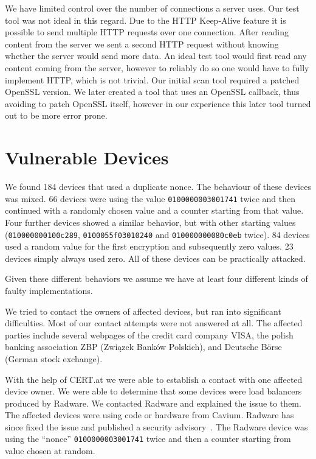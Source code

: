 \documentclass[10pt, a4paper]{article}
\begin{document}
We have limited control over the number of connections a server uses. Our test tool was not ideal in this regard.
Due to the HTTP Keep-Alive feature
it is possible to send multiple HTTP requests over one connection. After reading content from the server we sent a second HTTP request without knowing whether the server would
send more data. An ideal test tool would first
read any content coming from the server, however to reliably do so one would have to fully implement
HTTP, which is not trivial.
Our initial scan tool required a patched OpenSSL version. We later created a tool that uses an OpenSSL
callback, thus avoiding to patch OpenSSL itself, however in our experience this later tool turned
out to be more error prone.

\section{Vulnerable Devices}

We found 184 devices that used a duplicate nonce. The behaviour of these devices was mixed.
66 devices were using the value \texttt{0100000003001741} twice and then continued with a randomly chosen value and a counter
starting from that value. Four further devices showed a similar behavior, but with other starting values (\texttt{010000000100c289},
\texttt{0100055f03010240} and \texttt{010000000080c0eb} twice).
84 devices used a random value for the first encryption and subsequently
zero values. 23 devices simply always used zero. All of these devices can be practically attacked.

Given these different behaviors we assume we have at least four different kinds of faulty implementations.

We tried to contact the owners of affected devices, but ran into significant difficulties. Most of our contact
attempts were not answered at all. The affected
parties include several webpages of the credit card company VISA, the polish banking association ZBP
(Związek Banków Polskich), and Deutsche Börse (German stock exchange).

With the help of CERT.at we were able to establish a contact with one affected device owner.
We were able to determine that some devices were load balancers produced by Radware. We contacted Radware and explained the issue to them. The affected devices
were using code or hardware from Cavium. Radware has since fixed the issue and published a security advisory~\cite{radware2016}.
The Radware device was using the ``nonce'' \texttt{0100000003001741} twice and then a counter starting from value chosen at random.
\end{document}
